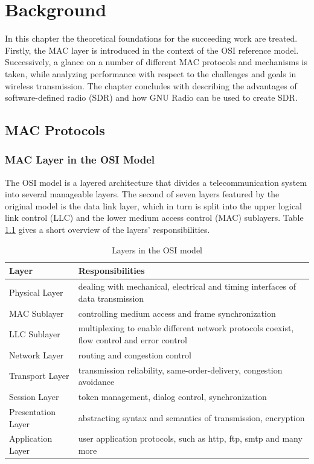 \chapter{Background}

In this chapter the theoretical foundations for the succeeding work are treated. Firstly, the MAC layer is introduced in the context of the OSI reference model. Successively, a glance on a number of different MAC protocols and mechanisms is taken, while analyzing performance with respect to the challenges and goals in wireless transmission. The chapter concludes with describing the advantages of software-defined radio (SDR) and how GNU Radio can be used to create SDR.

\section{MAC Protocols}

\subsection{MAC Layer in the OSI Model}

The OSI model is a layered architecture that divides a telecommunication system into several manageable layers. The second of seven layers featured by the original model is the data link layer, which in turn is split into the upper logical link control (LLC) and the lower medium access control (MAC) sublayers. Table \ref{tab:osi-layers} gives a short overview of the layers' responsibilities. 

\begin{table}[b]
	\centering
	\begin{center}
		\begin{tabular}{p{3.5cm}p{10cm}}
			\toprule
				Layer & Responsibilities \\
			\midrule
				Physical Layer & dealing with mechanical, electrical and timing interfaces of data transmission  \\
				MAC Sublayer & controlling medium access and frame synchronization \\
				LLC Sublayer & multiplexing to enable different network protocols coexist, flow control and error control \\
				Network Layer & routing and congestion control \\
				Transport Layer & transmission reliability, same-order-delivery, congestion avoidance  \\
				Session Layer & token management, dialog control, synchronization \\
				Presentation Layer & abstracting syntax and semantics of transmission, encryption \\
				Application Layer & user application protocols, such as http, ftp, smtp and many more \\
			\bottomrule
		\end{tabular}\caption{Layers in the OSI model} \label{tab:osi-layers}
	\end{center}
\end{table}

